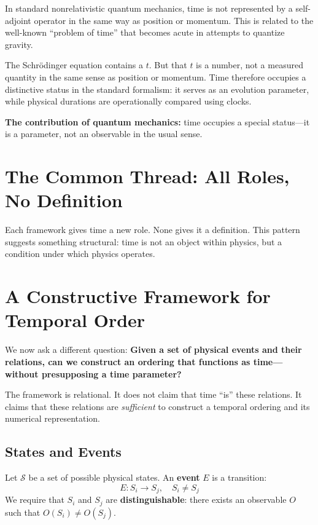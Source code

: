 \documentclass[12pt, a4paper]{article}
\begin{document}
In standard nonrelativistic quantum mechanics, time is not represented by a self-adjoint operator in the same way as position or momentum. This is related to the well-known ``problem of time'' that becomes acute in attempts to quantize gravity.

The Schr\"odinger equation contains a \( t \). But that \( t \) is a number, not a measured quantity in the same sense as position or momentum. Time therefore occupies a distinctive status in the standard formalism: it serves as an evolution parameter, while physical durations are operationally compared using clocks.

\textbf{The contribution of quantum mechanics:} time occupies a special status---it is a parameter, not an observable in the usual sense.

\section{The Common Thread: All Roles, No Definition}

Each framework gives time a new role. None gives it a definition. This pattern suggests something structural: time is not an object within physics, but a condition under which physics operates.

\section{A Constructive Framework for Temporal Order}

We now ask a different question: \textbf{Given a set of physical events and their relations, can we construct an ordering that functions as time---without presupposing a time parameter?}

The framework is relational. It does not claim that time ``is'' these relations. It claims that these relations are \textit{sufficient} to construct a temporal ordering and its numerical representation.

\subsection{States and Events}

Let \( \mathcal{S} \) be a set of possible physical states. An \textbf{event} \( E \) is a transition:
\[
E: S_i \rightarrow S_j, \quad S_i \neq S_j
\]
We require that \( S_i \) and \( S_j \) are \textbf{distinguishable}: there exists an observable \( O \) such that \( O(S_i) \neq O(S_j) \).
\end{document}
